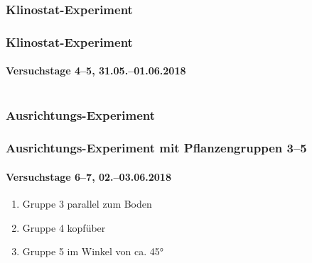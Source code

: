 \documentclass[aspectratio=169
]{beamer}
\begin{document}
\subsubsection{Klinostat-Experiment}

\begin{frame}%
\frametitle{Klinostat-Experiment}
\framesubtitle{Versuchstage 4--5, 31.05.--01.06.2018}
\begin{columns}
	
\end{columns}
\end{frame}

% 		
% 	
% 
% 
% 	


\subsubsection{Ausrichtungs-Experiment}
	
\begin{frame}[<+(1)->]
\frametitle{Ausrichtungs-Experiment mit Pflanzengruppen 3--5}
\framesubtitle{Versuchstage 6--7, 02.--03.06.2018}
	
\begin{enumerate}
\item Gruppe 3 parallel zum Boden
\item Gruppe 4 kopfüber
\item Gruppe 5 im Winkel von ca. \ang{45}
\end{enumerate}
	
\end{frame}
\end{document}
